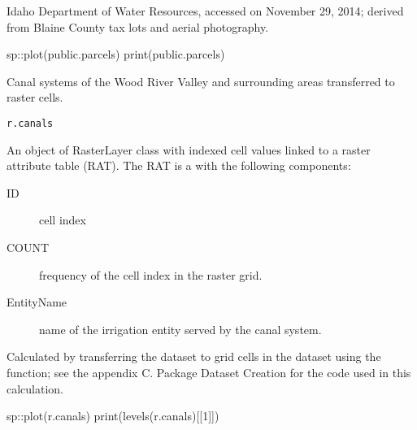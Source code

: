 \documentclass[a4paper]{book}
\begin{document}
%
\begin{Source}\relax
Idaho Department of Water Resources, accessed on November 29, 2014;
derived from Blaine County tax lots and aerial photography.
\end{Source}
%
\begin{Examples}
\begin{ExampleCode}
sp::plot(public.parcels)
print(public.parcels)

\end{ExampleCode}
\end{Examples}
%
\begin{Description}\relax
Canal systems of the Wood River Valley and surrounding areas transferred to raster cells.
\end{Description}
%
\begin{Usage}
\begin{verbatim}
r.canals
\end{verbatim}
\end{Usage}
%
\begin{Format}
An object of RasterLayer class with indexed cell values linked to
a raster attribute table (RAT).
The RAT is a  with the following components:
\begin{description}

\item[ID] cell index
\item[COUNT] frequency of the cell index in the raster grid.
\item[EntityName] name of the irrigation entity served by the canal system.

\end{description}
\end{Format}
%
\begin{Source}\relax
Calculated by transferring the  dataset to grid cells in the
 dataset using the  function;
see the appendix C. Package Dataset Creation for the \R{} code used in this calculation.
\end{Source}
%
\begin{Examples}
\begin{ExampleCode}
sp::plot(r.canals)
print(levels(r.canals)[[1]])

\end{ExampleCode}
\end{Examples}
\end{document}
